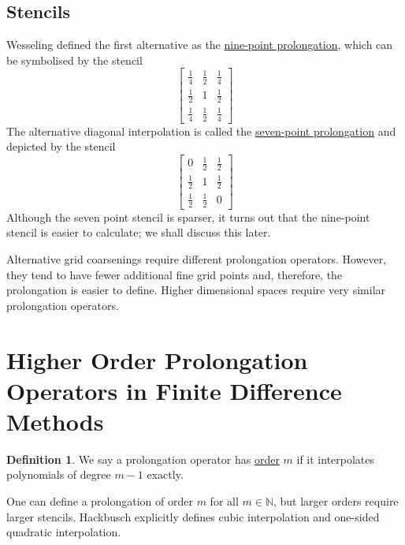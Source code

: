 \documentclass[a4paper,10pt,oneside]{book}
\theoremstyle{plain}%
\theoremstyle{definition}
\newtheorem{defn}{Definition}[section]
\theoremstyle{remark}
\newcommand{\bbN}{\mathbb{N}}
\begin{document}
\subsection{Stencils}
Wesseling \cite{Wesseling82} defined the first alternative as the
\underline{nine-point prolongation}, which can be symbolised by the stencil
\begin{equation}
 \begin{bmatrix}
  \frac{1}{4} & \frac{1}{2} & \frac{1}{4}\\
  \frac{1}{2} &           1 & \frac{1}{2}\\
  \frac{1}{4} & \frac{1}{2} & \frac{1}{4}
 \end{bmatrix}
\end{equation}
The alternative diagonal interpolation is called the \underline{seven-point
prolongation} and depicted by the stencil
\begin{equation}
 \begin{bmatrix}
            0 & \frac{1}{2} & \frac{1}{2}\\
  \frac{1}{2} &           1 & \frac{1}{2}\\
  \frac{1}{2} & \frac{1}{2} &           0
 \end{bmatrix}
\end{equation}
Although the seven point stencil is sparser, it turns out that the nine-point
stencil is easier to calculate; we shall discuss this later.

Alternative grid coarsenings require different prolongation operators. However,
they tend to have fewer additional fine grid points and, therefore, the
prolongation is easier to define. Higher dimensional spaces require very
similar prolongation operators.

\section[Higher Order Prolongation Operators]{Higher Order Prolongation
Operators in Finite Difference Methods}
\begin{defn}
 We say a prolongation operator has \underline{order} $m$ if it interpolates
polynomials of degree $m-1$ exactly.
\end{defn}
One can define a prolongation of order $m$ for all $m\in\bbN$, but larger
orders require larger stencils. Hackbusch \cite{Hackbusch85} explicitly defines
cubic interpolation and one-sided quadratic interpolation.
\end{document}
